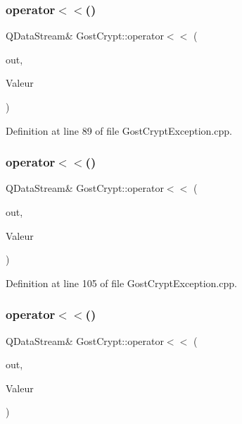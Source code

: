 \subsubsection{\texorpdfstring{operator$<$$<$()}{operator<<()}\hspace{0.1cm}{\footnotesize\ttfamily [5/13]}}
{\footnotesize\ttfamily Q\+Data\+Stream\& Gost\+Crypt\+::operator$<$$<$ (\begin{DoxyParamCaption}\item[{Q\+Data\+Stream \&}]{out,  }\item[{const \hyperlink{class_gost_crypt_1_1_failed_flush_file}{Gost\+Crypt\+::\+Failed\+Flush\+File} \&}]{Valeur }\end{DoxyParamCaption})}



Definition at line 89 of file Gost\+Crypt\+Exception.\+cpp.

\mbox{\label{namespace_gost_crypt_a3bf39c44968d5f8e6020dca9f7f8b1bd}} 
\subsubsection{\texorpdfstring{operator$<$$<$()}{operator<<()}\hspace{0.1cm}{\footnotesize\ttfamily [6/13]}}
{\footnotesize\ttfamily Q\+Data\+Stream\& Gost\+Crypt\+::operator$<$$<$ (\begin{DoxyParamCaption}\item[{Q\+Data\+Stream \&}]{out,  }\item[{const \hyperlink{class_gost_crypt_1_1_failed_lseek_file}{Gost\+Crypt\+::\+Failed\+Lseek\+File} \&}]{Valeur }\end{DoxyParamCaption})}



Definition at line 105 of file Gost\+Crypt\+Exception.\+cpp.

\mbox{\label{namespace_gost_crypt_a2a84fea66f94caa3fcd7ae107bdda4f0}} 
\subsubsection{\texorpdfstring{operator$<$$<$()}{operator<<()}\hspace{0.1cm}{\footnotesize\ttfamily [7/13]}}
{\footnotesize\ttfamily Q\+Data\+Stream\& Gost\+Crypt\+::operator$<$$<$ (\begin{DoxyParamCaption}\item[{Q\+Data\+Stream \&}]{out,  }\item[{const \hyperlink{class_gost_crypt_1_1_failed_stat_file}{Gost\+Crypt\+::\+Failed\+Stat\+File} \&}]{Valeur }\end{DoxyParamCaption})}



